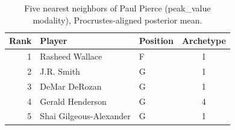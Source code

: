 \begin{table}[htbp]
  \centering\small
  \begin{tabular}{rllc}
    \toprule
    Rank & Player & Position & Archetype \\
    \midrule
    1 & Rasheed Wallace & F & 1 \\
    2 & J.R. Smith & G & 1 \\
    3 & DeMar DeRozan & G & 1 \\
    4 & Gerald Henderson & G & 4 \\
    5 & Shai Gilgeous-Alexander & G & 1 \\
    \bottomrule
  \end{tabular}
  \caption{Five nearest neighbors of Paul Pierce (peak_value modality), Procrustes-aligned posterior mean.}
  \label{tab:Paul_Pierce_neighbors_peak_value}
\end{table}

